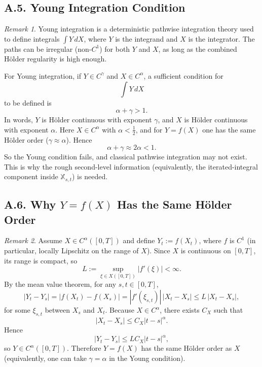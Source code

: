 \documentclass[11pt]{article}
\theoremstyle{definition}
\theoremstyle{remark}
\newtheorem{remark}{Remark}
\begin{document}
\subsection*{A.5. Young Integration Condition}
\begin{remark}
Young integration is a deterministic pathwise integration theory used to define integrals $\int Y\,dX$, where $Y$ is the integrand and $X$ is the integrator. The paths can be irregular (non-$C^1$) for both $Y$ and $X$, as long as the combined H\"older regularity is high enough.

For Young integration, if $Y\in C^\gamma$ and $X\in C^\alpha$, a sufficient condition for
\[
\int Y\,dX
\]
to be defined is
\[
\alpha+\gamma>1.
\]
In words, $Y$ is H\"older continuous with exponent $\gamma$, and $X$ is H\"older continuous with exponent $\alpha$.
Here $X\in C^\alpha$ with $\alpha<\frac12$, and for $Y=f(X)$ one has the same H\"older order ($\gamma\approx\alpha$). Hence
\[
\alpha+\gamma\approx 2\alpha<1.
\]
So the Young condition fails, and classical pathwise integration may not exist. This is why the rough second-level information (equivalently, the iterated-integral component inside $\mathbb{X}_{s,t}$) is needed.
\end{remark}

\subsection*{A.6. Why $Y=f(X)$ Has the Same H\"older Order}
\begin{remark}
Assume $X\in C^\alpha([0,T])$ and define $Y_t:=f(X_t)$, where $f$ is $C^1$ (in particular, locally Lipschitz on the range of $X$). Since $X$ is continuous on $[0,T]$, its range is compact, so
\[
L:=\sup_{\xi\in X([0,T])}|f'(\xi)|<\infty.
\]
By the mean value theorem, for any $s,t\in[0,T]$,
\[
|Y_t-Y_s|
=
|f(X_t)-f(X_s)|
=
|f'(\xi_{s,t})|\,|X_t-X_s|
\le
L\,|X_t-X_s|,
\]
for some $\xi_{s,t}$ between $X_s$ and $X_t$.
Because $X\in C^\alpha$, there exists $C_X$ such that
\[
|X_t-X_s|\le C_X|t-s|^\alpha.
\]
Hence
\[
|Y_t-Y_s|
\le
LC_X|t-s|^\alpha,
\]
so $Y\in C^\alpha([0,T])$. Therefore $Y=f(X)$ has the same H\"older order as $X$ (equivalently, one can take $\gamma=\alpha$ in the Young condition).
\end{remark}
\end{document}

